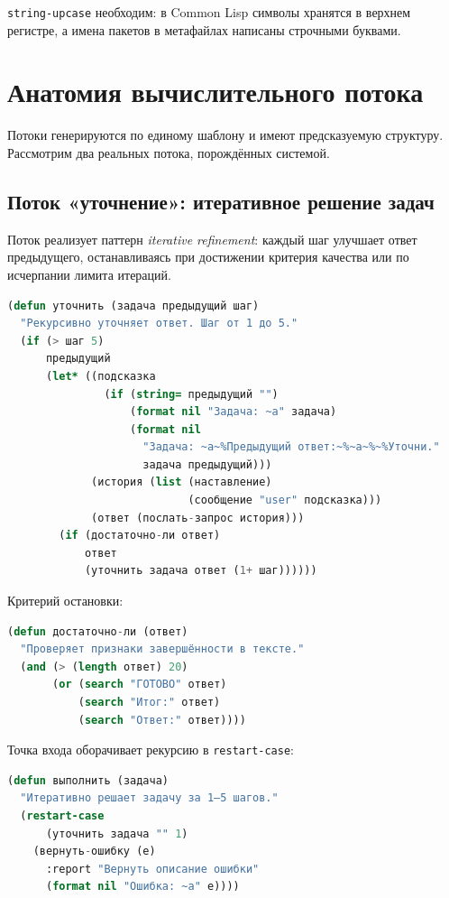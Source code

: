 \documentclass[11pt,a4paper]{article}
\begin{document}
\texttt{string-upcase} необходим: в Common Lisp символы хранятся в верхнем регистре,
а имена пакетов в метафайлах написаны строчными буквами.

\section{Анатомия вычислительного потока}

Потоки генерируются по единому шаблону и имеют предсказуемую структуру.
Рассмотрим два реальных потока, порождённых системой.

\subsection{Поток «уточнение»: итеративное решение задач}

Поток реализует паттерн \emph{iterative refinement}: каждый шаг улучшает ответ
предыдущего, останавливаясь при достижении критерия качества или по исчерпании
лимита итераций.

\begin{lstlisting}[language=CommonLisp, caption={Поток уточнения: ядро алгоритма}]
(defun уточнить (задача предыдущий шаг)
  "Рекурсивно уточняет ответ. Шаг от 1 до 5."
  (if (> шаг 5)
      предыдущий
      (let* ((подсказка
               (if (string= предыдущий "")
                   (format nil "Задача: ~a" задача)
                   (format nil
                     "Задача: ~a~%Предыдущий ответ:~%~a~%~%Уточни."
                     задача предыдущий)))
             (история (list (наставление)
                            (сообщение "user" подсказка)))
             (ответ (послать-запрос история)))
        (if (достаточно-ли ответ)
            ответ
            (уточнить задача ответ (1+ шаг))))))
\end{lstlisting}

Критерий остановки:

\begin{lstlisting}[language=CommonLisp, caption={Критерий качества ответа}]
(defun достаточно-ли (ответ)
  "Проверяет признаки завершённости в тексте."
  (and (> (length ответ) 20)
       (or (search "ГОТОВО" ответ)
           (search "Итог:" ответ)
           (search "Ответ:" ответ))))
\end{lstlisting}

Точка входа оборачивает рекурсию в \texttt{restart-case}:

\begin{lstlisting}[language=CommonLisp, caption={Точка входа потока уточнения}]
(defun выполнить (задача)
  "Итеративно решает задачу за 1–5 шагов."
  (restart-case
      (уточнить задача "" 1)
    (вернуть-ошибку (e)
      :report "Вернуть описание ошибки"
      (format nil "Ошибка: ~a" e))))
\end{lstlisting}
\end{document}
